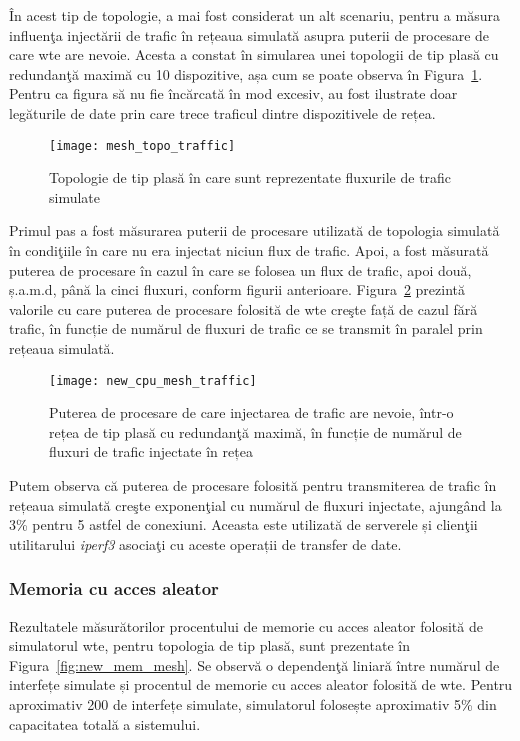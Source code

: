 În acest tip de topologie, a mai fost considerat un alt scenariu, pentru a măsura influenţa injectării de trafic în rețeaua simulată asupra puterii de procesare de care \gls{wte} are nevoie. Acesta a constat în simularea unei topologii de tip plasă cu redundanţă maximă cu 10 dispozitive, așa cum se poate observa în Figura~\ref{fig:mesh_topo_traffic}. Pentru ca figura să nu fie încărcată în mod excesiv, au fost ilustrate doar legăturile de date prin care trece traficul dintre dispozitivele de rețea.

\begin{figure}[hp]
	\centering
	\texttt{[image: mesh\_topo\_traffic]}
	\caption{Topologie de tip plasă în care sunt reprezentate fluxurile de trafic simulate}
	\label{fig:mesh_topo_traffic}
\end{figure}

Primul pas a fost măsurarea puterii de procesare utilizată de topologia simulată în condiţiile în care nu era injectat niciun flux de trafic. Apoi, a fost măsurată puterea de procesare în cazul în care se folosea un flux de trafic, apoi două, ș.a.m.d, până la cinci fluxuri, conform figurii anterioare. Figura~\ref{fig:new_cpu_mesh_traffic} prezintă valorile cu care puterea de procesare folosită de \gls{wte} creşte față de cazul fără trafic, în funcție de numărul de fluxuri de trafic ce se transmit în paralel prin rețeaua simulată.

\begin{figure}[h]
	\centering
	\texttt{[image: new\_cpu\_mesh\_traffic]}
	\caption{Puterea de procesare de care injectarea de trafic are nevoie, într-o rețea de tip plasă cu redundanţă maximă, în funcție de numărul de fluxuri de trafic injectate în rețea}
	\label{fig:new_cpu_mesh_traffic}
\end{figure}

Putem observa că puterea de procesare folosită pentru transmiterea de trafic în rețeaua simulată creşte exponenţial cu numărul de fluxuri injectate, ajungând la 3\% pentru 5 astfel de conexiuni. Aceasta este utilizată de serverele și clienţii utilitarului \textit{iperf3} asociaţi cu aceste operații de transfer de date.

\subsubsection{Memoria cu acces aleator}

Rezultatele măsurătorilor procentului de memorie cu acces aleator folosită de simulatorul \gls{wte}, pentru topologia de tip plasă, sunt prezentate în Figura~\ref{fig:new_mem_mesh}. Se observă o dependenţă liniară între numărul de interfețe simulate și procentul de memorie cu acces aleator folosită de \gls{wte}. Pentru aproximativ 200 de interfețe simulate, simulatorul folosește aproximativ 5\% din capacitatea totală a sistemului.

